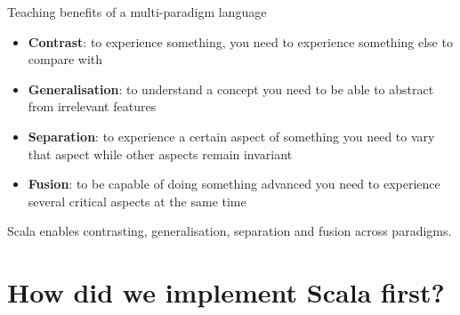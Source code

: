 \documentclass[aspectratio=169]{beamer}
\newcommand{\Section}[1]{\titleimagecolor{red}\section{#1}}
\newenvironment{Slide}[1]%
  {\begin{frame}[environment=Slide]{#1}}
  {\end{frame}}%
\begin{document}
\begin{Slide}{Teaching benefits of a multi-paradigm language}
\begin{minipage}{0.85\textwidth}
\begin{itemize}
    \begin{itemize}
      \item \textbf{Contrast}: to experience something, you need to experience something else to compare with    
      \item \textbf{Generalisation}: to understand a concept you need to be able to abstract from irrelevant features    
      \item \textbf{Separation}: to experience a certain aspect of something you need to vary that aspect while other aspects remain invariant    
      \item \textbf{Fusion}: to be capable of doing something advanced you need to experience several critical aspects at the same time    
    \end{itemize}
  \end{itemize}
\end{minipage}

\vspace{1em} Scala enables contrasting, generalisation, separation and fusion across paradigms.

\end{Slide}

\Section{How did we implement Scala first?}
\end{document}
